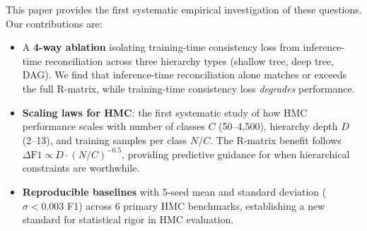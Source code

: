 This paper provides the first systematic empirical investigation of
these questions. Our contributions are:

\begin{itemize}[leftmargin=*,nosep]
  \item A \textbf{4-way ablation} isolating training-time consistency
    loss from inference-time reconciliation across three hierarchy
    types (shallow tree, deep tree, DAG). We find that inference-time
    reconciliation alone matches or exceeds the full R-matrix, while
    training-time consistency loss \emph{degrades} performance.
  \item \textbf{Scaling laws for HMC}: the first systematic study of how
    HMC performance scales with number of classes $C$ (50--4,500),
    hierarchy depth $D$ (2--13), and training samples per class
    $N/C$. The R-matrix benefit follows $\Delta\text{F1} \propto
    D \cdot (N/C)^{-0.5}$, providing predictive guidance for when
    hierarchical constraints are worthwhile.
  \item \textbf{Reproducible baselines} with 5-seed mean and standard
    deviation ($\sigma < 0.003$ F1) across 6 primary HMC benchmarks,
    establishing a new standard for statistical rigor in HMC evaluation.
\end{itemize}
